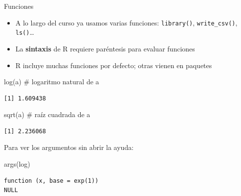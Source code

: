 \documentclass[
  9pt,
  ignorenonframetext,
]{beamer}
\newenvironment{Shaded}{\begin{snugshade}}{\end{snugshade}}
\newcommand{\CommentTok}[1]{\textcolor[rgb]{0.37,0.37,0.37}{#1}}
\newcommand{\FunctionTok}[1]{\textcolor[rgb]{0.28,0.35,0.67}{#1}}
\newcommand{\NormalTok}[1]{\textcolor[rgb]{0.00,0.23,0.31}{#1}}
\providecommand{\tightlist}{%
  \setlength{\itemsep}{0pt}\setlength{\parskip}{0pt}}\usepackage{longtable,booktabs,array}
\begin{document}
\begin{frame}[fragile]{Funciones}
\label{funciones}
\begin{itemize}
\tightlist
\item
  A lo largo del curso ya usamos varias funciones: \texttt{library()},
  \texttt{write\_csv()}, \texttt{ls()}\ldots{}
\item
  La \textbf{sintaxis} de R requiere paréntesis para evaluar funciones
\item
  R incluye muchas funciones por defecto; otras vienen en paquetes
\end{itemize}

\begin{Shaded}
\begin{Highlighting}[]
\FunctionTok{log}\NormalTok{(a)          }\CommentTok{\# logaritmo natural de a}
\end{Highlighting}
\end{Shaded}

\begin{verbatim}
[1] 1.609438
\end{verbatim}

\begin{Shaded}
\begin{Highlighting}[]
\FunctionTok{sqrt}\NormalTok{(a)         }\CommentTok{\# raíz cuadrada de a}
\end{Highlighting}
\end{Shaded}

\begin{verbatim}
[1] 2.236068
\end{verbatim}

Para ver los argumentos sin abrir la ayuda:

\begin{Shaded}
\begin{Highlighting}[]
\FunctionTok{args}\NormalTok{(log)}
\end{Highlighting}
\end{Shaded}

\begin{verbatim}
function (x, base = exp(1)) 
NULL
\end{verbatim}
\end{frame}
\end{document}
